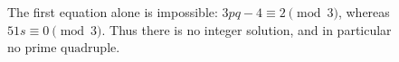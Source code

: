 The first equation alone is impossible: $3pq-4\equiv2\pmod3$, whereas $51s\equiv0\pmod3$. Thus there is no integer solution, and in particular $\boxed{\text{no prime quadruple}}$.
